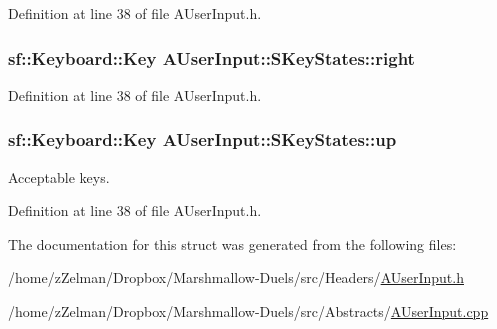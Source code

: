 Definition at line 38 of file A\-User\-Input.\-h.

\hypertarget{structAUserInput_1_1SKeyStates_aa9551aac4a89e8c78e20d4a12a8afcee}{
\subsubsection[{right}]{\setlength{\rightskip}{0pt plus 5cm}sf\-::\-Keyboard\-::\-Key A\-User\-Input\-::\-S\-Key\-States\-::right}}\label{structAUserInput_1_1SKeyStates_aa9551aac4a89e8c78e20d4a12a8afcee}


Definition at line 38 of file A\-User\-Input.\-h.

\hypertarget{structAUserInput_1_1SKeyStates_a738215f9ee9440c8f11aa0a10fa83d42}{
\subsubsection[{up}]{\setlength{\rightskip}{0pt plus 5cm}sf\-::\-Keyboard\-::\-Key A\-User\-Input\-::\-S\-Key\-States\-::up}}\label{structAUserInput_1_1SKeyStates_a738215f9ee9440c8f11aa0a10fa83d42}


Acceptable keys. 



Definition at line 38 of file A\-User\-Input.\-h.



The documentation for this struct was generated from the following files\-:\begin{DoxyCompactItemize}
\item 
/home/z\-Zelman/\-Dropbox/\-Marshmallow-\/\-Duels/src/\-Headers/\hyperlink{AUserInput_8h}{A\-User\-Input.\-h}\item 
/home/z\-Zelman/\-Dropbox/\-Marshmallow-\/\-Duels/src/\-Abstracts/\hyperlink{AUserInput_8cpp}{A\-User\-Input.\-cpp}\end{DoxyCompactItemize}
